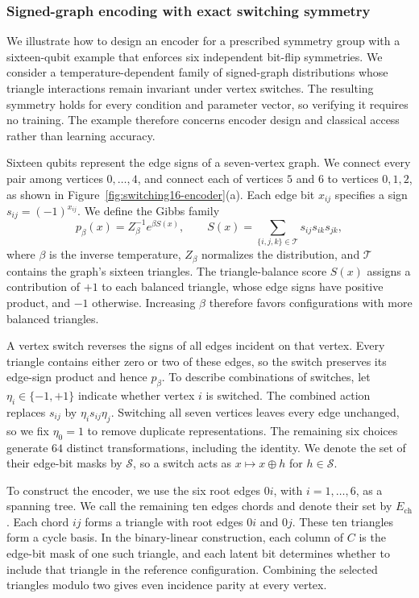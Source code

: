 \subsubsection{Signed-graph encoding with exact switching symmetry}
\label{sec:conditional-switching16}

We illustrate how to design an encoder for a prescribed symmetry group with a sixteen-qubit example that enforces six independent bit-flip symmetries. We consider a temperature-dependent family of signed-graph distributions whose triangle interactions remain invariant under vertex switches. The resulting symmetry holds for every condition and parameter vector, so verifying it requires no training. The example therefore concerns encoder design and classical access rather than learning accuracy.

Sixteen qubits represent the edge signs of a seven-vertex graph. We connect every pair among vertices $0,\ldots,4$, and connect each of vertices $5$ and $6$ to vertices $0,1,2$, as shown in Figure~\ref{fig:switching16-encoder}(a). Each edge bit $x_{ij}$ specifies a sign $s_{ij}=(-1)^{x_{ij}}$. We define the Gibbs family
\begin{equation}
 p_\beta(x)=Z_\beta^{-1}e^{\beta S(x)},\qquad
 S(x)=\sum_{\{i,j,k\}\in\mathcal T}s_{ij}s_{ik}s_{jk},
\end{equation}
where $\beta$ is the inverse temperature, $Z_\beta$ normalizes the distribution, and $\mathcal T$ contains the graph's sixteen triangles. The triangle-balance score $S(x)$ assigns a contribution of $+1$ to each balanced triangle, whose edge signs have positive product, and $-1$ otherwise. Increasing $\beta$ therefore favors configurations with more balanced triangles.

A vertex switch reverses the signs of all edges incident on that vertex. Every triangle contains either zero or two of these edges, so the switch preserves its edge-sign product and hence $p_\beta$. To describe combinations of switches, let $\eta_i\in\{-1,+1\}$ indicate whether vertex $i$ is switched. The combined action replaces $s_{ij}$ by $\eta_i s_{ij}\eta_j$. Switching all seven vertices leaves every edge unchanged, so we fix $\eta_0=1$ to remove duplicate representations. The remaining six choices generate $64$ distinct transformations, including the identity. We denote the set of their edge-bit masks by $\mathcal S$, so a switch acts as $x\mapsto x\oplus h$ for $h\in\mathcal S$.

To construct the encoder, we use the six root edges $0i$, with $i=1,\ldots,6$, as a spanning tree. We call the remaining ten edges chords and denote their set by $E_{\mathrm{ch}}$. Each chord $ij$ forms a triangle with root edges $0i$ and $0j$. These ten triangles form a cycle basis. In the binary-linear construction, each column of $C$ is the edge-bit mask of one such triangle, and each latent bit determines whether to include that triangle in the reference configuration. Combining the selected triangles modulo two gives even incidence parity at every vertex.

